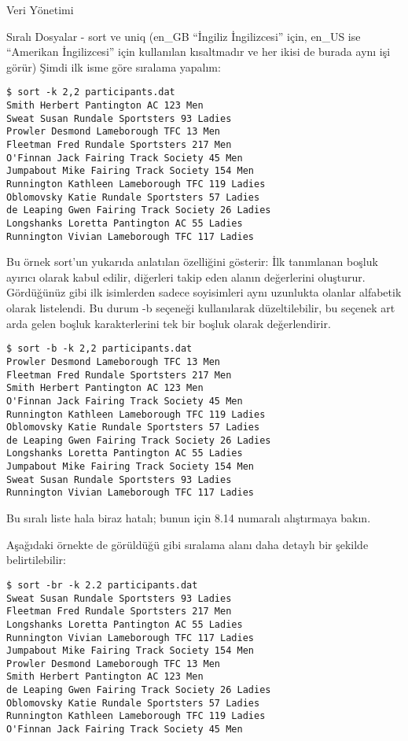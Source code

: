 \begin{section}{Veri Yönetimi}
\begin{subsection}{Sıralı Dosyalar - sort ve uniq}
(en\_GB “İngiliz İngilizcesi” için, en\_US ise “Amerikan İngilizcesi” için kullanılan kısaltmadır ve her ikisi de burada aynı işi görür) Şimdi ilk isme göre sıralama yapalım:

\begin{verbatim}
$ sort -k 2,2 participants.dat
Smith Herbert Pantington AC 123 Men
Sweat Susan Rundale Sportsters 93 Ladies
Prowler Desmond Lameborough TFC 13 Men
Fleetman Fred Rundale Sportsters 217 Men
O'Finnan Jack Fairing Track Society 45 Men
Jumpabout Mike Fairing Track Society 154 Men
Runnington Kathleen Lameborough TFC 119 Ladies
Oblomovsky Katie Rundale Sportsters 57 Ladies
de Leaping Gwen Fairing Track Society 26 Ladies
Longshanks Loretta Pantington AC 55 Ladies
Runnington Vivian Lameborough TFC 117 Ladies
\end{verbatim}

Bu örnek sort'un yukarıda anlatılan özelliğini gösterir: İlk tanımlanan boşluk ayırıcı olarak kabul edilir, diğerleri takip eden alanın değerlerini oluşturur. Gördüğünüz gibi ilk isimlerden sadece soyisimleri aynı uzunlukta olanlar alfabetik olarak listelendi. Bu durum -b seçeneği kullanılarak düzeltilebilir, bu seçenek art arda gelen boşluk karakterlerini tek bir boşluk olarak değerlendirir.

\begin{verbatim}
$ sort -b -k 2,2 participants.dat
Prowler Desmond Lameborough TFC 13 Men
Fleetman Fred Rundale Sportsters 217 Men
Smith Herbert Pantington AC 123 Men
O'Finnan Jack Fairing Track Society 45 Men
Runnington Kathleen Lameborough TFC 119 Ladies
Oblomovsky Katie Rundale Sportsters 57 Ladies
de Leaping Gwen Fairing Track Society 26 Ladies
Longshanks Loretta Pantington AC 55 Ladies
Jumpabout Mike Fairing Track Society 154 Men
Sweat Susan Rundale Sportsters 93 Ladies
Runnington Vivian Lameborough TFC 117 Ladies
\end{verbatim}

Bu sıralı liste hala biraz hatalı; bunun için 8.14 numaralı alıştırmaya bakın.

Aşağıdaki örnekte de görüldüğü gibi sıralama alanı daha detaylı bir şekilde belirtilebilir:

\begin{verbatim}
$ sort -br -k 2.2 participants.dat
Sweat Susan Rundale Sportsters 93 Ladies
Fleetman Fred Rundale Sportsters 217 Men
Longshanks Loretta Pantington AC 55 Ladies
Runnington Vivian Lameborough TFC 117 Ladies
Jumpabout Mike Fairing Track Society 154 Men
Prowler Desmond Lameborough TFC 13 Men
Smith Herbert Pantington AC 123 Men
de Leaping Gwen Fairing Track Society 26 Ladies
Oblomovsky Katie Rundale Sportsters 57 Ladies
Runnington Kathleen Lameborough TFC 119 Ladies
O'Finnan Jack Fairing Track Society 45 Men
\end{verbatim}


\end{subsection}
\end{section}

